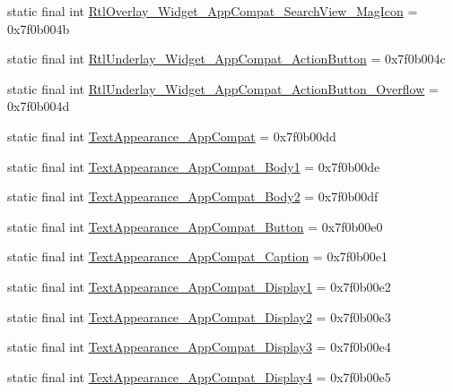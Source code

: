 \begin{CompactItemize}
\item 
static final int \hyperlink{classandroid_1_1support_1_1graphics_1_1drawable_1_1_r_1_1style_d2d28a4ca0ed9b9ad100d76c425fc464}{RtlOverlay\_\-Widget\_\-AppCompat\_\-SearchView\_\-MagIcon} = 0x7f0b004b
\item 
static final int \hyperlink{classandroid_1_1support_1_1graphics_1_1drawable_1_1_r_1_1style_516510b67a2020bb7a4b7d2bec52e2ac}{RtlUnderlay\_\-Widget\_\-AppCompat\_\-ActionButton} = 0x7f0b004c
\item 
static final int \hyperlink{classandroid_1_1support_1_1graphics_1_1drawable_1_1_r_1_1style_278752fec4b334d0c74fd19e9f0b86c9}{RtlUnderlay\_\-Widget\_\-AppCompat\_\-ActionButton\_\-Overflow} = 0x7f0b004d
\item 
static final int \hyperlink{classandroid_1_1support_1_1graphics_1_1drawable_1_1_r_1_1style_ecbb8afd011a8a6b4a4dea98bf1bdb39}{TextAppearance\_\-AppCompat} = 0x7f0b00dd
\item 
static final int \hyperlink{classandroid_1_1support_1_1graphics_1_1drawable_1_1_r_1_1style_729830242d585fdfc372c8caccdfee83}{TextAppearance\_\-AppCompat\_\-Body1} = 0x7f0b00de
\item 
static final int \hyperlink{classandroid_1_1support_1_1graphics_1_1drawable_1_1_r_1_1style_b4701efdc2740bff3ba135fd20e09eac}{TextAppearance\_\-AppCompat\_\-Body2} = 0x7f0b00df
\item 
static final int \hyperlink{classandroid_1_1support_1_1graphics_1_1drawable_1_1_r_1_1style_2ef4419cfe8902e36c44eff695e07aca}{TextAppearance\_\-AppCompat\_\-Button} = 0x7f0b00e0
\item 
static final int \hyperlink{classandroid_1_1support_1_1graphics_1_1drawable_1_1_r_1_1style_fb265e865f8989864e87ea823c0b16a3}{TextAppearance\_\-AppCompat\_\-Caption} = 0x7f0b00e1
\item 
static final int \hyperlink{classandroid_1_1support_1_1graphics_1_1drawable_1_1_r_1_1style_aac8009f87a0a2f2d96c9a34c72a4ba3}{TextAppearance\_\-AppCompat\_\-Display1} = 0x7f0b00e2
\item 
static final int \hyperlink{classandroid_1_1support_1_1graphics_1_1drawable_1_1_r_1_1style_361c494b289515d6f3795204ae601689}{TextAppearance\_\-AppCompat\_\-Display2} = 0x7f0b00e3
\item 
static final int \hyperlink{classandroid_1_1support_1_1graphics_1_1drawable_1_1_r_1_1style_13ff6b7bb706b12f447d8cd0b06df642}{TextAppearance\_\-AppCompat\_\-Display3} = 0x7f0b00e4
\item 
static final int \hyperlink{classandroid_1_1support_1_1graphics_1_1drawable_1_1_r_1_1style_a7f77943de2ee8a07e9f5ad5cf821027}{TextAppearance\_\-AppCompat\_\-Display4} = 0x7f0b00e5

\end{CompactItemize}
